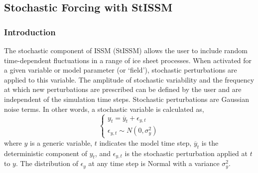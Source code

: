 
\subsection{Stochastic Forcing with StISSM} \label{sec:using-issm-advanced-stochastic-forcing}
\subsubsection{Introduction} 
The stochastic component of ISSM (StISSM) allows the user to include random time-dependent fluctuations in a range of ice sheet processes. When activated for a given variable or model parameter (or `field'), stochastic perturbations are applied to this variable. The amplitude of stochastic variability and the frequency at which new perturbations are prescribed can be defined by the user and are independent of the simulation time steps. Stochastic perturbations are Gaussian noise terms. In other words, a stochastic variable is calculated as,
\begin{equation} \label{eq1}
\begin{cases}
	y_{t} = \overline{y}_{t}+\epsilon_{y,t} \\
	\epsilon_{y,t} \sim N\left(0,\sigma^{2}_{y}\right)
\end{cases}
\end{equation}
where $y$ is a generic variable, $t$ indicates the model time step, $\overline{y}_{t}$ is the deterministic component of $y_{t}$, and $\epsilon_{y,t}$ is the stochastic perturbation applied at $t$ to $y$. The distribution of $\epsilon_{y}$ at any time step is Normal with a variance $\sigma^{2}_{y}$.

